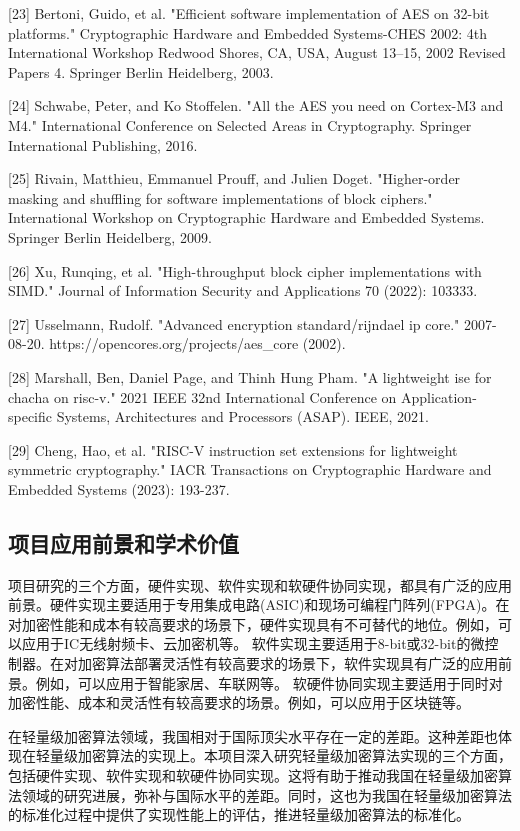 \documentclass{ctexart}
\begin{document}
[23] Bertoni, Guido, et al. "Efficient software implementation of AES on 32-bit platforms." Cryptographic Hardware and Embedded Systems-CHES 2002: 4th International Workshop Redwood Shores, CA, USA, August 13–15, 2002 Revised Papers 4. Springer Berlin Heidelberg, 2003.

[24] Schwabe, Peter, and Ko Stoffelen. "All the AES you need on Cortex-M3 and M4." International Conference on Selected Areas in Cryptography. Springer International Publishing, 2016.

[25] Rivain, Matthieu, Emmanuel Prouff, and Julien Doget. "Higher-order masking and shuffling for software implementations of block ciphers." International Workshop on Cryptographic Hardware and Embedded Systems. Springer Berlin Heidelberg, 2009.

[26] Xu, Runqing, et al. "High-throughput block cipher implementations with SIMD." Journal of Information Security and Applications 70 (2022): 103333.

[27] Usselmann, Rudolf. "Advanced encryption standard/rijndael ip core." 2007-08-20. https://opencores.org/projects/aes\_core (2002).

[28] Marshall, Ben, Daniel Page, and Thinh Hung Pham. "A lightweight ise for chacha on risc-v." 2021 IEEE 32nd International Conference on Application-specific Systems, Architectures and Processors (ASAP). IEEE, 2021.

[29] Cheng, Hao, et al. "RISC-V instruction set extensions for lightweight symmetric cryptography." IACR Transactions on Cryptographic Hardware and Embedded Systems (2023): 193-237.

\subsection{项目应用前景和学术价值}
项目研究的三个方面，硬件实现、软件实现和软硬件协同实现，都具有广泛的应用前景。硬件实现主要适用于专用集成电路(ASIC)和现场可编程门阵列(FPGA)。在对加密性能和成本有较高要求的场景下，硬件实现具有不可替代的地位。例如，可以应用于IC无线射频卡、云加密机等。
软件实现主要适用于8-bit或32-bit的微控制器。在对加密算法部署灵活性有较高要求的场景下，软件实现具有广泛的应用前景。例如，可以应用于智能家居、车联网等。
软硬件协同实现主要适用于同时对加密性能、成本和灵活性有较高要求的场景。例如，可以应用于区块链等。

在轻量级加密算法领域，我国相对于国际顶尖水平存在一定的差距。这种差距也体现在轻量级加密算法的实现上。本项目深入研究轻量级加密算法实现的三个方面，包括硬件实现、软件实现和软硬件协同实现。这将有助于推动我国在轻量级加密算法领域的研究进展，弥补与国际水平的差距。同时，这也为我国在轻量级加密算法的标准化过程中提供了实现性能上的评估，推进轻量级加密算法的标准化。
\end{document}
